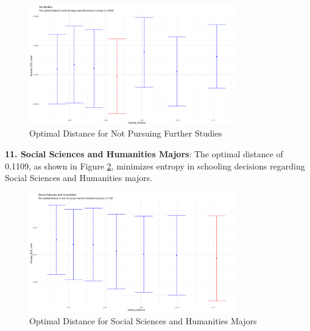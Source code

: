 \begin{figure}[H]
    \centering
    \includegraphics[width=0.8\textwidth]{Graph/Results/optimal_distance_bs30_NO_STUDIES.png}
    \caption{Optimal Distance for Not Pursuing Further Studies}
    \label{fig:optimal_distance_no_studies}
\end{figure}

\textbf{ 11. Social Sciences and Humanities Majors}:
    The optimal distance of 0.1109, as shown in Figure \ref{fig:optimal_distance_soc_sci_hum}, minimizes entropy in schooling decisions regarding Social Sciences and Humanities majors.

\begin{figure}[H]
    \centering
    \includegraphics[width=0.8\textwidth]{Graph/Results/optimal_distance_bs30_SOCIAL_SCIENCES_HUMANITIES.png}
    \caption{Optimal Distance for Social Sciences and Humanities Majors}
    \label{fig:optimal_distance_soc_sci_hum}
\end{figure}
